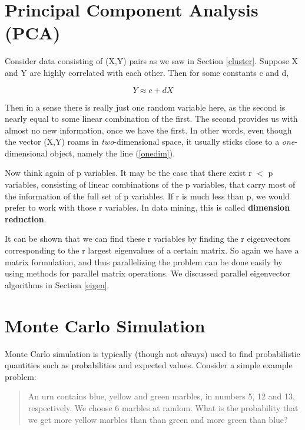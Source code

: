 \section{Principal Component Analysis (PCA)}
\label{pca}

Consider data consisting of (X,Y) pairs as we saw in Section
\ref{cluster}.  Suppose X and Y are highly correlated with each other.
Then for some constants c and d,

\begin{equation}
\label{onedim}
Y \approx c + d X
\end{equation}

Then in a sense there is really just one random variable here, as the
second is nearly equal to some linear combination of the first.  The
second provides us with almost no new information, once we have the
first.  In other words, even though the vector (X,Y) roams in {\it
two}-dimensional space, it usually sticks close to a {\it
one}-dimensional object, namely the line (\ref{onedim}).

Now think again of p variables.  It may be the case that there exist r
$<$ p variables, consisting of linear combinations of the p variables,
that carry most of the information of the full set of p variables.  If r
is much less than p, we would prefer to work with those r variables.
In data mining, this is called {\bf dimension reduction}.

It can be shown that we can find these r variables by finding the r
eigenvectors corresponding to the r largest eigenvalues of a certain
matrix.  So again we have a matrix formulation, and thus parallelizing
the problem can be done easily by using methods for parallel matrix
operations.  We discussed parallel eigenvector algorithms in Section
\ref{eigen}.

\section{Monte Carlo Simulation}

Monte Carlo simulation is typically (though not always) used to find
probabilistic quantities such as probabilities and expected values.
Consider a simple example problem:

\begin{quote}

An urn contains blue, yellow and green marbles, in numbers 5, 12 and 13,
respectively.  We choose 6 marbles at random.  What is the probability
that we get more yellow marbles than than green and more green than
blue?

\end{quote}

